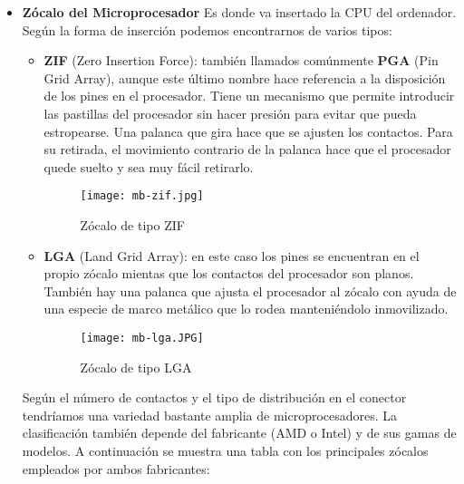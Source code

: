 \begin{itemize}
    \item \textbf{Zócalo del Microprocesador}
    Es donde va insertado la CPU del ordenador. Según la forma de inserción podemos encontrarnos de varios tipos:

    \begin{itemize}
        \item \textbf{ZIF} (Zero Insertion Force): también llamados comúnmente \textbf{PGA} (Pin Grid Array), aunque este último nombre hace referencia a la disposición de los pines en el procesador. Tiene un mecanismo que permite introducir las pastillas del procesador sin hacer presión para evitar que pueda estropearse. Una palanca que gira hace que se ajusten los contactos. Para su retirada, el movimiento contrario de la palanca hace que el procesador quede suelto y sea muy fácil retirarlo.

        \begin{figure}[ht]
            \centering
            \texttt{[image: mb-zif.jpg]}
            \caption{Zócalo de tipo ZIF}
        \end{figure}

        \item \textbf{LGA} (Land Grid Array): en este caso los pines se encuentran en el propio zócalo mientas que los contactos del procesador son planos. También hay una palanca que ajusta el procesador al zócalo con ayuda de una especie de marco metálico que lo rodea manteniéndolo inmovilizado.

        \begin{figure}[ht]
            \centering
            \texttt{[image: mb-lga.JPG]}
            \caption{Zócalo de tipo LGA}
        \end{figure}
    \end{itemize}

    Según el número de contactos y el tipo de distribución en el conector tendríamos una variedad bastante amplia de microprocesadores. La clasificación también depende del fabricante (AMD o Intel) y de sus gamas de modelos. A continuación se muestra una tabla con los principales zócalos empleados por ambos fabricantes:

        \begin{figure}[ht]

        \vspace{3ex}
        \centering

        \setlength{\tabcolsep}{10pt}
        \renewcommand{\arraystretch}{1.4}


\end{figure}
\end{itemize}
